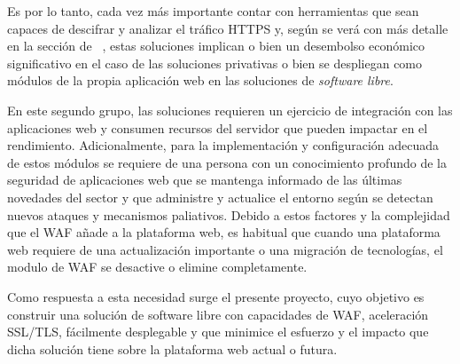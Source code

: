 \par Es por lo tanto, cada vez más importante contar con herramientas que sean capaces de descifrar y analizar el tráfico HTTPS y, según se verá con más detalle
en la sección de ~, estas soluciones implican o bien un desembolso económico significativo en el caso de las soluciones privativas o
bien se despliegan como módulos de la propia aplicación web en las soluciones de {\em software libre\cite{softwarelibre}}.
\par En este segundo grupo, las soluciones requieren un ejercicio de integración con las aplicaciones web y consumen recursos del servidor que pueden impactar
en el rendimiento. Adicionalmente, para la implementación y configuración adecuada de estos módulos se requiere de una persona con un conocimiento profundo de
la seguridad de aplicaciones web que se mantenga informado de las últimas novedades del sector y que administre y actualice el entorno según se detectan nuevos
ataques y mecanismos paliativos.  Debido a estos factores y la complejidad que el WAF añade a la plataforma web, es habitual que cuando una plataforma web
requiere de una actualización importante o una migración de tecnologías, el modulo de WAF se desactive o elimine completamente.

\par Como respuesta a esta necesidad surge el presente proyecto, cuyo objetivo es construir una solución de software libre con capacidades de WAF, aceleración
SSL/TLS, fácilmente desplegable y que minimice el esfuerzo y el impacto que dicha solución tiene sobre la plataforma web actual o futura.
